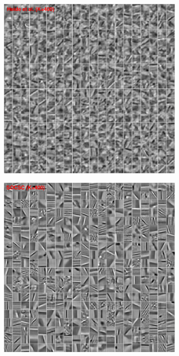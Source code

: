 \begin{figure}[h]
\centering
  \begin{subfigure}{0.5\textwidth}
  \includegraphics[width=1\linewidth]{figure/heide400-supple.pdf}
  \end{subfigure}
  \vspace{0.2cm}
  \begin{subfigure}{0.5\textwidth}
  \includegraphics[width=1\linewidth]{figure/online400-supple.pdf}
  \end{subfigure}
  \vspace{0.2cm}


\end{figure}
